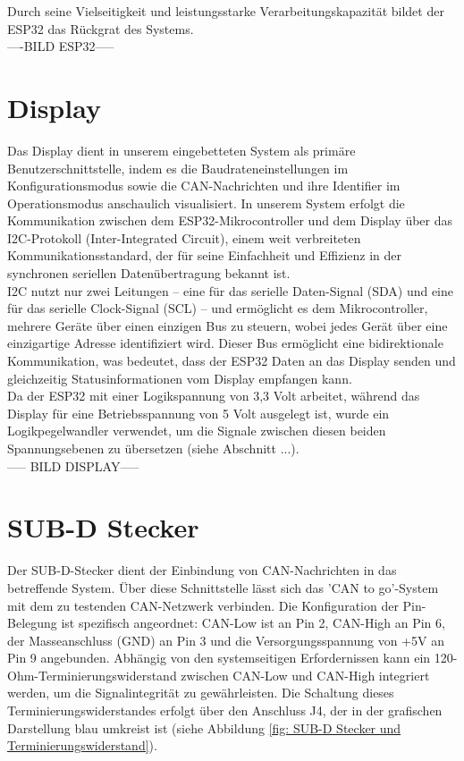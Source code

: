 \noindent Durch seine Vielseitigkeit und leistungsstarke Verarbeitungskapazität bildet der ESP32 das Rückgrat des Systems.\\
----BILD ESP32-----

\section{Display}
\noindent Das Display dient in unserem eingebetteten System als primäre Benutzerschnittstelle, indem es die Baudrateneinstellungen im Konfigurationsmodus sowie die CAN-Nachrichten und ihre Identifier im Operationsmodus anschaulich visualisiert. In unserem System erfolgt die Kommunikation zwischen dem ESP32-Mikrocontroller und dem Display über das I2C-Protokoll (Inter-Integrated Circuit), einem weit verbreiteten Kommunikationsstandard, der für seine Einfachheit und Effizienz in der synchronen seriellen Datenübertragung bekannt ist.\\

\noindent I2C nutzt nur zwei Leitungen – eine für das serielle Daten-Signal (SDA) und eine für das serielle Clock-Signal (SCL) – und ermöglicht es dem Mikrocontroller, mehrere Geräte über einen einzigen Bus zu steuern, wobei jedes Gerät über eine einzigartige Adresse identifiziert wird. Dieser Bus ermöglicht eine bidirektionale Kommunikation, was bedeutet, dass der ESP32 Daten an das Display senden und gleichzeitig Statusinformationen vom Display empfangen kann. \\

\noindent Da der ESP32 mit einer Logikspannung von 3,3 Volt arbeitet, während das Display für eine Betriebsspannung von 5 Volt ausgelegt ist, wurde ein Logikpegelwandler verwendet, um die Signale zwischen diesen beiden Spannungsebenen zu übersetzen (siehe Abschnitt ...).\\

----- BILD DISPLAY-----

\section{SUB-D Stecker}
\noindent Der SUB-D-Stecker dient der Einbindung von CAN-Nachrichten in das betreffende System. Über diese Schnittstelle lässt sich das 'CAN to go'-System mit dem zu testenden CAN-Netzwerk verbinden. Die Konfiguration der Pin-Belegung ist spezifisch angeordnet: CAN-Low ist an Pin 2, CAN-High an Pin 6, der Masseanschluss (GND) an Pin 3 und die Versorgungsspannung von +5V an Pin 9 angebunden. Abhängig von den systemseitigen Erfordernissen kann ein 120-Ohm-Terminierungswiderstand zwischen CAN-Low und CAN-High integriert werden, um die Signalintegrität zu gewährleisten. Die Schaltung dieses Terminierungswiderstandes erfolgt über den Anschluss J4, der in der grafischen Darstellung blau umkreist ist (siehe Abbildung \ref{fig: SUB-D Stecker und Terminierungswiderstand}).\\

